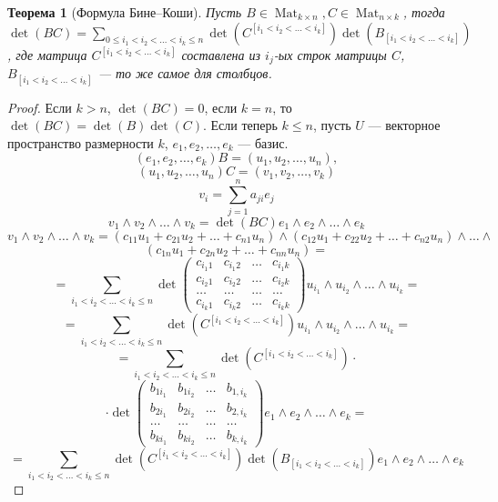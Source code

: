 \documentclass{article}
\newtheorem*{theorem}{Теорема}
\theoremstyle{definition}
\theoremstyle{remark}
\DeclareMathOperator{\Mat}{Mat}
\begin{document}
\begin{theorem}[Формула Бине--Коши]
Пусть $B \in \Mat_{k \times n}, C \in \Mat_{n \times k}$, тогда $\det(BC) = \sum_{0 \le i_1 < i_2 < \ldots < i_k \leq n} \det(C^{[i_1 < i_2 <\ldots < i_k]}) \det(B_{[i_1 < i_2 <\ldots < i_k]})$, где матрица $C^{[i_1 < i_2 <\ldots < i_k]}$ составлена из $i_j$-ых строк матрицы $C$, $B_{[i_1 < i_2 <\ldots < i_k]}$ --- то же самое для столбцов.
\end{theorem}
\begin{proof}
Если $k > n$, $\det(BC) = 0$, если $k = n$, то $\det(BC) = \det(B) \det(C)$. Если теперь $k \leq n$, пусть $U$ --- векторное пространство размерности $k$, $e_1, e_2, \ldots, e_k$ --- базис.
$$(e_1, e_2, \ldots, e_k)B = (u_1, u_2, \ldots, u_n),$$
$$(u_1, u_2, \ldots, u_n)C = (v_1, v_2, \ldots, v_k)$$
$$v_i = \sum_{j = 1}^n a_{ji}e_j$$
$$v_1 \wedge v_2 \wedge \ldots \wedge v_k = \det(BC) e_1 \wedge e_2 \wedge \ldots \wedge e_k$$
$$v_1 \wedge v_2 \wedge \ldots \wedge v_k = (c_{11} u_1 + c_{21} u_2 + \ldots + c_{n1} u_n) \wedge (c_{12} u_1 + c_{22} u_2 + \ldots + c_{n2} u_n) \wedge \ldots \wedge$$ 
$$(c_{1n}u_1 + c_{2n}u_2 + \ldots + c_{nn} u_n) =$$
$$ = \sum_{i_1 < i_2 < \ldots < i_k \leq n} \det\begin{pmatrix} c_{i_1 1} & c_{i_1 2} & \ldots & c_{i_1 k} \\ c_{i_2 1} & c_{i_2 2} & \ldots & c_{i_2 k} \\ \ldots & \ldots & \ldots  & \ldots \\ c_{i_k 1} & c_{i_k 2} & \ldots & c_{i_k k} \end{pmatrix} u_{i_1} \wedge u_{i_2} \wedge \ldots \wedge u_{i_k} =$$
$$= \sum_{i_1 < i_2 < \ldots < i_k \leq n} \det(C^{[i_1 < i_2 <\ldots < i_k]}) u_{i_1} \wedge u_{i_2} \wedge \ldots \wedge u_{i_k} =$$
$$= \sum_{i_1 < i_2 < \ldots < i_k \leq n} \det(C^{[i_1 < i_2 <\ldots < i_k]})\cdot$$
$$\cdot \det\begin{pmatrix} b_{1 i_1} & b_{1 i_2} & \ldots & b_{1, i_k} \\ b_{2 i_1} & b_{2 i_2} & \ldots & b_{2, i_k} \\ \ldots & \ldots & \ldots  & \ldots \\ b_{k i_1} & b_{k i_2} & \ldots & b_{k, i_k} \end{pmatrix} e_1 \wedge e_2 \wedge \ldots \wedge e_k =$$
$$= \sum_{i_1 < i_2 < \ldots < i_k \leq n} \det(C^{[i_1 < i_2 <\ldots < i_k]}) \det(B_{[i_1 < i_2 <\ldots < i_k]}) e_1 \wedge e_2 \wedge \ldots \wedge e_k$$
\end{proof}
\end{document}
